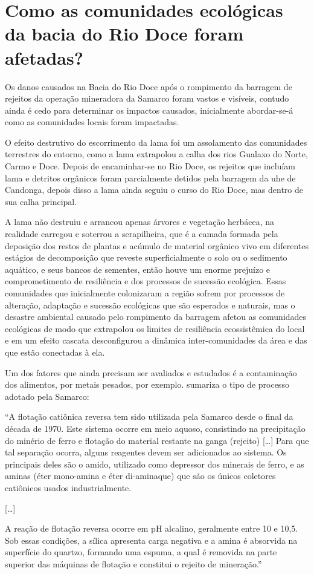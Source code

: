 \documentclass[
article,			%
11pt,				%
oneside,			%
a4paper,			%
english,			%
brazil,				%
sumario=tradicional
]{abntex2}
\begin{document}
	\section{Como as comunidades ecológicas da bacia do Rio Doce foram afetadas?}
	
	Os danos causados na Bacia do Rio Doce após o rompimento da barragem de rejeitos da operação mineradora da Samarco foram vastos e visíveis, contudo ainda é cedo para determinar os impactos causados, inicialmente abordar-se-á como as comunidades locais foram impactadas.
	
	O efeito destrutivo do escorrimento da lama foi um assolamento das comunidades terrestres do entorno, como a lama extrapolou a calha dos rios Gualaxo do Norte, Carmo e Doce. Depois de encaminhar-se no Rio Doce, os rejeitos que incluíam lama e detritos orgânicos foram parcialmente detidos pela barragem da \gls{uhe} de Candonga, depois disso a lama ainda seguiu o curso do Rio Doce, mas dentro de sua calha principal.
	
	A lama não destruiu e arrancou apenas árvores e vegetação herbácea, na realidade carregou e soterrou a serapilheira, que é a camada formada pela deposição dos restos de plantas e acúmulo de material orgânico vivo em diferentes estágios de decomposição que reveste superficialmente o solo ou o sedimento aquático, e seus bancos de sementes, então houve um enorme prejuízo e comprometimento de resiliência e dos processos de sucessão ecológica. Essas comunidades que inicialmente colonizaram a região sofrem por processos de alteração, adaptação e sucessão ecológicas que são esperados e naturais, mas o desastre ambiental causado pelo rompimento da barragem afetou as comunidades ecológicas de modo que extrapolou os limites de resiliência ecossistêmica do local e em um efeito cascata desconfigurou a dinâmica inter-comunidades da área e das que estão conectadas à ela.
	
	Um dos fatores que ainda precisam ser avaliados e estudados é a contaminação dos alimentos, por metais pesados, por exemplo.  sumariza o tipo de processo adotado pela Samarco:
	
	\begin{citacao}
		``A flotação catiônica reversa tem sido utilizada pela Samarco desde o final da década de 1970. Este sistema ocorre em meio aquoso, consistindo na precipitação do minério de ferro e flotação do material restante na ganga (rejeito) [\dots] Para que tal separação ocorra, alguns reagentes devem ser adicionados ao sistema. Os principais deles são o amido, utilizado como depressor dos minerais de ferro, e as aminas (éter mono-amina e éter di-aminaque) que são os únicos coletores catiônicos usados industrialmente.
		
		[\dots]

		A reação de flotação reversa ocorre em pH alcalino, geralmente entre 10 e 10,5. Sob essas condições, a sílica apresenta carga negativa e a amina é absorvida na superfície do quartzo, formando uma espuma, a qual é removida na parte superior das máquinas de flotação e constitui o rejeito de mineração.''
	\end{citacao}
	
\end{document}
